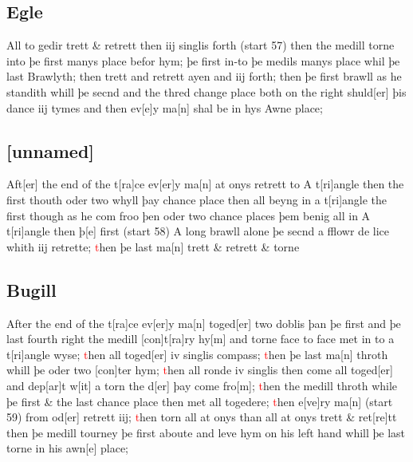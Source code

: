 \documentclass[12pt,letter]{article} %
\newcommand{\red}[1]{\textcolor{red}{#1}}
\newcommand{\srcpg}[1]{(start #1)}
\begin{document}
\subsection{Egle}
All to gedir trett \& retrett then iij singlis forth \srcpg{57} then the
medill torne into þe first manys place befor hym; þe first in-to þe
medils manys place whil þe last Brawlyth; then trett and retrett ayen
and iij forth; then þe first brawll as he standith whill þe secnd and
the thred change place both on the right shuld{[}er{]} þis dance iij
tymes and then ev{[}e{]}y ma{[}n{]} shal be in hys Awne place;

\subsection{{[}unnamed{]}}
Aft{[}er{]} the end of the t{[}ra{]}ce ev{[}er{]}y ma{[}n{]} at
onys retrett to A t{[}ri{]}angle then the first thouth oder two whyll
þay chance place then all beyng in a t{[}ri{]}angle the first though as
he com froo þen oder two chance places þem benig all in A t{[}ri{]}angle
then þ{[}e{]} first \srcpg{58} A long brawll alone þe secnd a fflowr de
lice whith iij retrette; \red{t}hen þe last ma{[}n{]} trett \& retrett \&
torne

\subsection{Bugill}
After the end of the t{[}ra{]}ce ev{[}er{]}y ma{[}n{]} toged{[}er{]} two
doblis þan þe first and þe last fourth right the medill
{[}con{]}t{[}ra{]}ry hy{[}m{]} and torne face to face met in to a
t{[}ri{]}angle wyse; \red{t}hen all toged{[}er{]} iv singlis compass; \red{t}hen þe
last ma{[}n{]} throth whill þe oder two {[}con{]}ter hym; \red{t}hen all ronde
iv singlis then come all toged{[}er{]} and dep{[}ar{]}t w{[}it{]} a torn
the d{[}er{]} þay come fro{[}m{]}; \red{t}hen the medill throth while þe first
\& the last chance place then met all togedere; \red{t}hen e{[}ve{]}ry
ma{[}n{]} \srcpg{59} from od{[}er{]} retrett iij; \red{t}hen torn all at onys
than all at onys trett \& ret{[}re{]}tt then þe medill tourney þe first
aboute and leve hym on his left hand whill þe last torne in his
awn{[}e{]} place;
\end{document}
